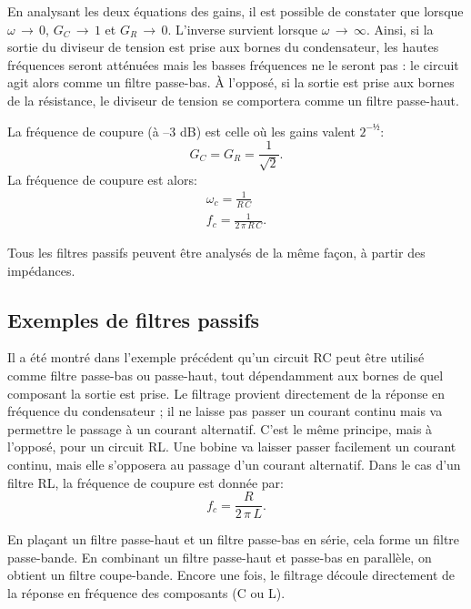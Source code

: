 \documentclass[12pt,oneside,letterpaper]{article}
\begin{document}
En analysant les deux équations des gains, il est possible de constater que lorsque $\omega\,\rightarrow\,0$, $G_C\,\rightarrow\,1$ et $G_R\,\rightarrow\,0$. L'inverse survient lorsque $\omega\,\rightarrow\,\infty$. Ainsi, si la sortie du diviseur de tension est prise aux bornes du condensateur, les hautes fréquences seront atténuées mais les basses fréquences ne le seront pas : le circuit agit alors comme un filtre passe-bas. À l'opposé, si la sortie est prise aux bornes de la résistance, le diviseur de tension se comportera comme un filtre passe-haut.

La fréquence de coupure (à --3 dB) est celle où les gains valent $2^{-½}$:
\begin{equation}
G_C=G_R=\frac{1}{\sqrt{2}}.
\end{equation}
La fréquence de coupure est alors:
\begin{subequations}
\begin{gather}
\omega_c=\frac{1}{R\,C}\\
f_c=\frac{1}{2\,\pi\,R\,C}.
\end{gather}
\end{subequations}

Tous les filtres passifs peuvent être analysés de la même façon, à partir des impédances.


\subsection{Exemples de filtres passifs}

Il a été montré dans l'exemple précédent qu'un circuit RC peut être utilisé comme filtre passe-bas ou passe-haut, tout dépendamment aux bornes de quel composant la sortie est prise. Le filtrage provient directement de la réponse en fréquence du condensateur ; il ne laisse pas passer un courant continu mais va permettre le passage à un courant alternatif. C'est le même principe, mais à l'opposé, pour un circuit RL. Une bobine va laisser passer facilement un courant continu, mais elle s'opposera au passage d'un courant alternatif. Dans le cas d'un filtre RL, la fréquence de coupure est donnée par:
\begin{equation}
f_c=\frac{R}{2\,\pi\,L}.
\end{equation}

En plaçant un filtre passe-haut et un filtre passe-bas en série, cela forme un filtre passe-bande. En combinant un filtre passe-haut et passe-bas en parallèle, on obtient un filtre coupe-bande. Encore une fois, le filtrage découle directement de la réponse en fréquence des composants (C ou L).
\end{document}
